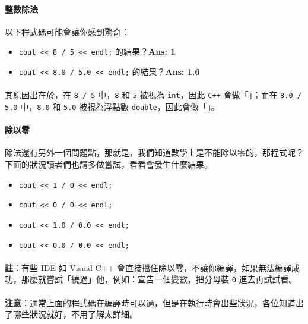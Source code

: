 \documentclass[12pt,a4paper,oneside]{article}
\begin{document}
\begin{CJK}{UTF8}{bkai}
\paragraph{整數除法}以下程式碼可能會讓你感到驚奇：
\begin{itemize}
\item \lstinline!cout << 8 / 5 << endl;! 的結果？{\textbf{Ans: 1}}
\item \lstinline!cout << 8.0 / 5.0 << endl;! 的結果？{\textbf{Ans: 1.6}}
\end{itemize}

\paragraph{}其原因出在於，在 \lstinline!8 / 5! 中，\lstinline!8! 和 \lstinline!5! 被視為 \lstinline!int!，因此 \texttt{C++} 會做「」；而在 \lstinline!8.0 / 5.0! 中，\lstinline!8.0! 和 \lstinline!5.0! 被視為浮點數 \lstinline!double!，因此會做「」。

\paragraph{除以零}除法還有另外一個問題點，那就是，我們知道數學上是不能除以零的，那程式呢？下面的狀況讀者們也請多做嘗試，看看會發生什麼結果。

\begin{itemize}
\item \lstinline!cout << 1 / 0 << endl;!
\item \lstinline!cout << 0 / 0 << endl;!
\item \lstinline!cout << 1.0 / 0.0 << endl;!
\item \lstinline!cout << 0.0 / 0.0 << endl;!
\end{itemize}

\paragraph{}\textbf{註}：有些 IDE 如 Visual C++ 會直接擋住除以零，不讓你編譯，如果無法編譯成功，那麼就嘗試「繞過」他，例如：宣告一個變數，把分母裝 \lstinline!0! 進去再試試看。
\paragraph{}\textbf{注意}：通常上面的程式碼在編譯時可以過，但是在執行時會出些狀況，各位知道出了哪些狀況就好，不用了解太詳細。


\end{CJK}
\end{document}
